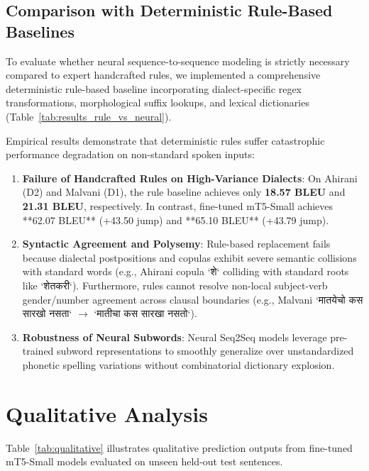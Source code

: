 \documentclass[journal,twocolumn]{IEEEtran}
\begin{document}
\subsection{Comparison with Deterministic Rule-Based Baselines}
To evaluate whether neural sequence-to-sequence modeling is strictly necessary compared to expert handcrafted rules, we implemented a comprehensive deterministic rule-based baseline incorporating dialect-specific regex transformations, morphological suffix lookups, and lexical dictionaries (Table~\ref{tab:results_rule_vs_neural}).

Empirical results demonstrate that deterministic rules suffer catastrophic performance degradation on non-standard spoken inputs:
\begin{enumerate}
    \item \textbf{Failure of Handcrafted Rules on High-Variance Dialects}: On Ahirani (D2) and Malvani (D1), the rule baseline achieves only \textbf{18.57 BLEU} and \textbf{21.31 BLEU}, respectively. In contrast, fine-tuned mT5-Small achieves **62.07 BLEU** (+43.50 jump) and **65.10 BLEU** (+43.79 jump).
    \item \textbf{Syntactic Agreement and Polysemy}: Rule-based replacement fails because dialectal postpositions and copulas exhibit severe semantic collisions with standard words (e.g., Ahirani copula `शे` colliding with standard roots like `शेतकरी`). Furthermore, rules cannot resolve non-local subject-verb gender/number agreement across clausal boundaries (e.g., Malvani `मातयेचो कस सारखो नसता` $\rightarrow$ `मातीचा कस सारखा नसतो`).
    \item \textbf{Robustness of Neural Subwords}: Neural Seq2Seq models leverage pre-trained subword representations to smoothly generalize over unstandardized phonetic spelling variations without combinatorial dictionary explosion.
\end{enumerate}

\section{Qualitative Analysis}
Table~\ref{tab:qualitative} illustrates qualitative prediction outputs from fine-tuned mT5-Small models evaluated on unseen held-out test sentences.
\end{document}
